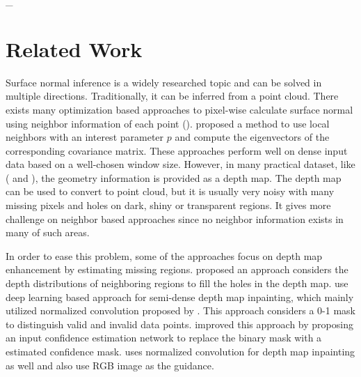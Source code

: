 _{}%

\chapter{Related Work} %

\label{ch:02} %

Surface normal inference is a widely researched topic and can be solved in multiple directions. Traditionally, it can be inferred from a point cloud. There exists many optimization based approaches to pixel-wise calculate surface normal using neighbor information of each point (\cite{optimized-methods}). \cite{Holzer.S} proposed a method to use local neighbors with an interest parameter $ p $ and compute the eigenvectors of the corresponding covariance matrix. These approaches perform well on dense input data based on a well-chosen window size. However, in many practical dataset, like  (\cite{nyu} and \cite{kitti-depth}), the geometry information is provided as a depth map. The depth map can be used to convert to point cloud, but it is usually very noisy with many missing pixels and holes on dark, shiny or transparent regions. It gives more challenge on neighbor based approaches since no neighbor information exists in many of such areas. 

In order to ease this problem, some of the approaches focus on depth map enhancement by estimating missing regions. \cite{depth-inpainting-distribution} proposed an approach considers the depth distributions of neighboring regions to fill the holes in the depth map. \cite{ncnn} use deep learning based approach for semi-dense depth map inpainting, which mainly utilized normalized convolution proposed by \cite{nconv}. This approach considers a 0-1 mask to distinguish valid and invalid data points. \cite{pncnn} improved this approach by proposing an input confidence estimation network to replace the binary mask with a estimated confidence mask. \cite{depth-enhance-guided} uses normalized convolution for depth map inpainting as well and also use RGB image as the guidance. 

